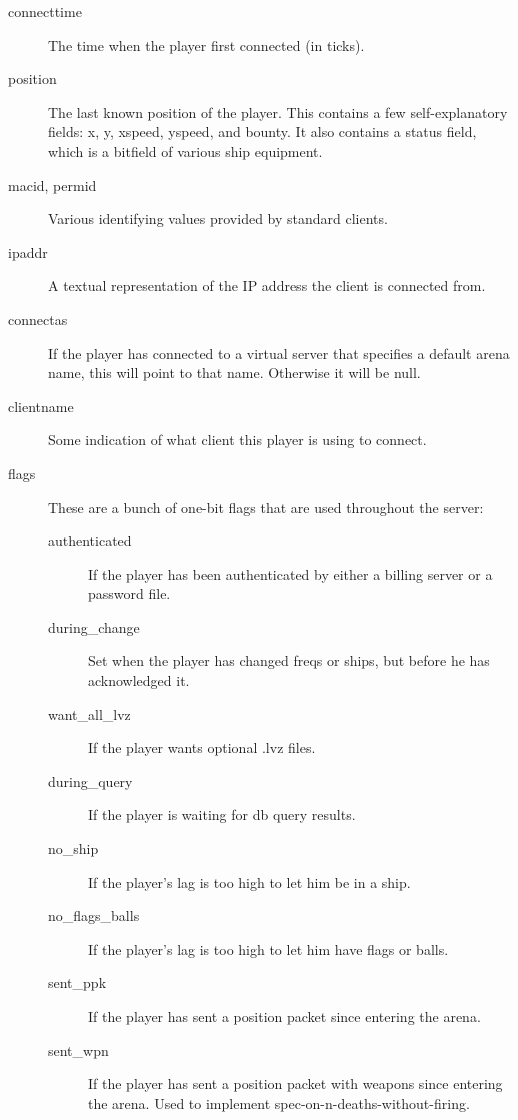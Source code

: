 \documentclass{article}
\begin{document}
\begin{description}
\item[connecttime] The time when the player first connected (in ticks).

\item[position] The last known position of the player. This contains a
few self-explanatory fields: x, y, xspeed, yspeed, and bounty. It also
contains a status field, which is a bitfield of various ship equipment.

\item[macid, permid] Various identifying values provided by standard
clients.

\item[ipaddr] A textual representation of the IP address the client is
connected from.

\item[connectas] If the player has connected to a virtual server that
specifies a default arena name, this will point to that name. Otherwise
it will be null.

\item[clientname] Some indication of what client this player is using to
connect.

\item[flags] These are a bunch of one-bit flags that are used throughout
the server:

\begin{description}

\item[authenticated] If the player has been authenticated by either a
billing server or a password file.

\item[during\_change] Set when the player has changed freqs or ships,
but before he has acknowledged it.

\item[want\_all\_lvz] If the player wants optional .lvz files.

\item[during\_query] If the player is waiting for db query results.

\item[no\_ship] If the player's lag is too high to let him be in a ship.

\item[no\_flags\_balls] If the player's lag is too high to let him have
flags or balls.

\item[sent\_ppk] If the player has sent a position packet since entering
the arena.

\item[sent\_wpn] If the player has sent a position packet with weapons
since entering the arena. Used to implement
spec-on-n-deaths-without-firing.


\end{description}
\end{description}
\end{document}
